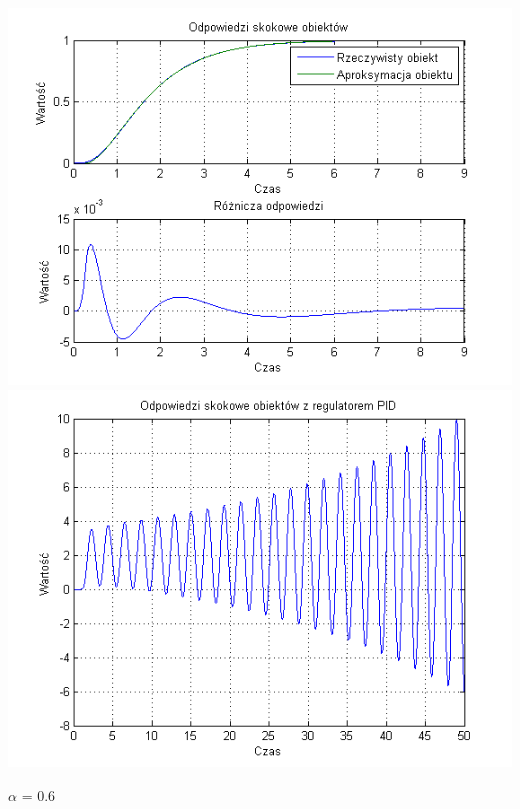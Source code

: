 \documentclass[10pt,a4paper]{article}
\begin{document}
\begin{center}
\includegraphics[scale=1]{images/dwa/skrypt_125.png}\\
\includegraphics[scale=1]{images/dwa/skrypt_126.png}\\
\end{center}
\newpage
$\alpha$ = 0.6
\end{document}
